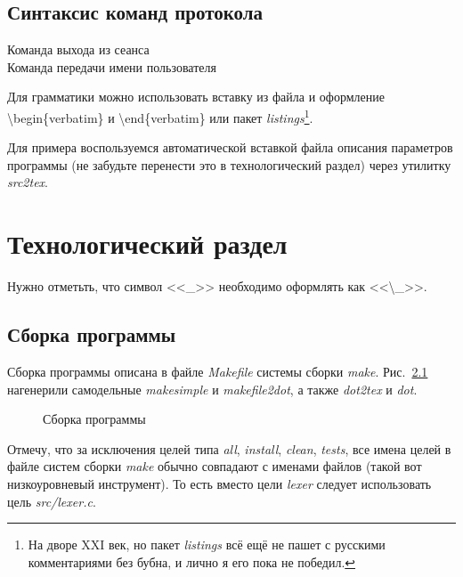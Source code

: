 \documentclass[a4paper,12pt]{report}
\begin{document}
\section{Синтаксис команд протокола}

\begin{description}
\item[Команда выхода из сеанса]
% 
\item[Команда передачи имени пользователя]
% 
\end{description}

Для грамматики можно использовать вставку из файла и оформление \textbackslash{}begin\{verbatim\} и \textbackslash{}end\{verbatim\} или пакет \textit{listings}\footnote{На дворе XXI век, но пакет \textit{listings} всё ещё не пашет с русскими комментариями без бубна, и лично я его пока не победил.}.

Для примера воспользуемся автоматической вставкой файла описания параметров программы (не забудьте перенести это в технологический раздел) через утилитку \textit{src2tex}.

% 
% 

\chapter{Технологический раздел}

Нужно отметьть, что символ <<\_>> необходимо оформлять как <<\textbackslash\_>>.

\section{Сборка программы}

Сборка программы описана в файле \textit{Makefile} системы сборки \textit{make}. Рис.~\ref{fig:make} нагенерили самодельные \textit{makesimple} и \textit{makefile2dot}, а также \textit{dot2tex} и \textit{dot}.

\begin{figure}
\centering
\caption{Сборка программы}
\label{fig:make}
\end{figure}

Отмечу, что за исключения целей типа \textit{all}, \textit{install}, \textit{clean}, \textit{tests}, все имена целей в файле систем сборки \textit{make} обычно совпадают с именами файлов (такой вот низкоуровневый инструмент). То есть вместо цели \textit{lexer} следует использовать цель \textit{src/lexer.c}.
\end{document}
